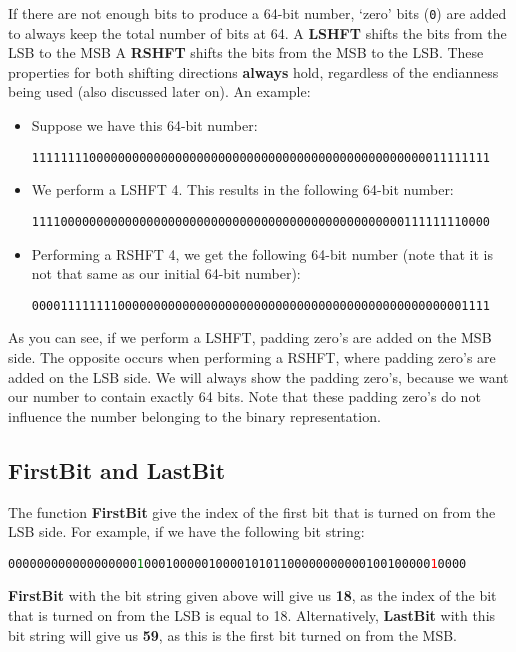 If there are not enough bits to produce a 64-bit number, `zero' bits (\texttt{0}) are added to always keep the total number of bits at 64.
A \textbf{LSHFT} shifts the bits from the LSB to the MSB
A \textbf{RSHFT} shifts the bits from the MSB to the LSB.
These properties for both shifting directions \textbf{always} hold, regardless of the endianness being used (also discussed later on).
An example:
%
\begin{itemize}
	\item Suppose we have this 64-bit number:
	\begin{center}
		\texttt{1111111100000000000000000000000000000000000000000000000011111111}
	\end{center}
	\item We perform a LSHFT 4. This results in the following 64-bit number:
	\begin{center}
		\texttt{1111000000000000000000000000000000000000000000000000111111110000}
	\end{center}
	\item Performing a RSHFT 4, we get the following 64-bit number (note that it is not that same as our initial 64-bit number):
	\begin{center}
		\begin{center}
			\texttt{0000111111110000000000000000000000000000000000000000000000001111}
		\end{center}
	\end{center}
\end{itemize}
%
As you can see, if we perform a LSHFT, padding zero's are added on the MSB side.
The opposite occurs when performing a RSHFT, where padding zero's are added on the LSB side.
We will always show the padding zero's, because we want our number to contain exactly 64 bits.
Note that these padding zero's do not influence the number belonging to the binary representation.

\subsection{FirstBit and LastBit}
The function \textbf{FirstBit} give the index of the first bit that is turned on from the LSB side.
For example, if we have the following bit string:
%
\begin{center}
	\texttt{000000000000000000\textcolor{green}{1}0001000001000010101100000000000100100000\textcolor{red}{1}0000}
\end{center}
%
\textbf{FirstBit} with the bit string given above will give us \textbf{18}, as the index of the bit that is turned on from the LSB is equal to 18.
Alternatively, \textbf{LastBit} with this bit string will give us \textbf{59}, as this is the first bit turned on from the MSB.

